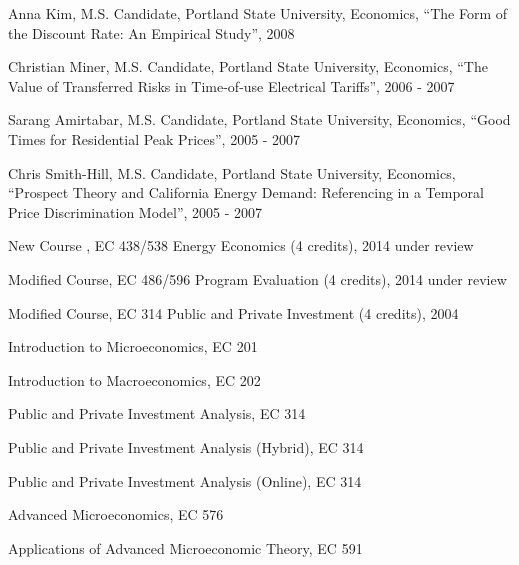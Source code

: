 \documentclass[Computer Science]{vita}
\begin{document}
\begin{vita}
\begin{Instructional Activities}
\begin{M.S. Thesis Adviser}
    \end{M.S. Thesis Adviser}

    \begin{M.S. Project Adviser}
    \item Anna Kim, M.S. Candidate, Portland State University,
      Economics, ``The Form of the Discount Rate: An Empirical
      Study'', 2008

    \item Christian Miner, M.S. Candidate, Portland State University,
      Economics, ``The Value of Transferred Risks in Time-of-use
      Electrical Tariffs'', 2006 - 2007

    \item Sarang Amirtabar, M.S. Candidate, Portland State University,
      Economics, ``Good Times for Residential Peak Prices'', 2005 -
      2007

    \item Chris Smith-Hill, M.S. Candidate, Portland State University,
      Economics, ``Prospect Theory and California Energy Demand:
      Referencing in a Temporal Price Discrimination Model'', 2005 -
      2007
    \end{M.S. Project Adviser}

    \begin{Curriculum Development}
    \item New Course , EC 438/538 Energy Economics (4 credits), 2014 under review
    \item Modified Course, EC 486/596 Program Evaluation (4 credits), 2014 under review
    \item Modified Course, EC 314 Public and Private Investment (4
      credits), 2004
    \end{Curriculum Development}

    \begin{Courses}
    \item Introduction to Microeconomics, EC 201
    \item Introduction to Macroeconomics, EC 202
    \item Public and Private Investment Analysis, EC 314
    \item Public and Private Investment Analysis (Hybrid), EC 314
    \item Public and Private Investment Analysis (Online), EC 314
				
    \item Advanced Microeconomics, EC 576
    \item Applications of Advanced Microeconomic Theory, EC 591


\end{Courses}
\end{Instructional Activities}
\end{vita}
\end{document}
